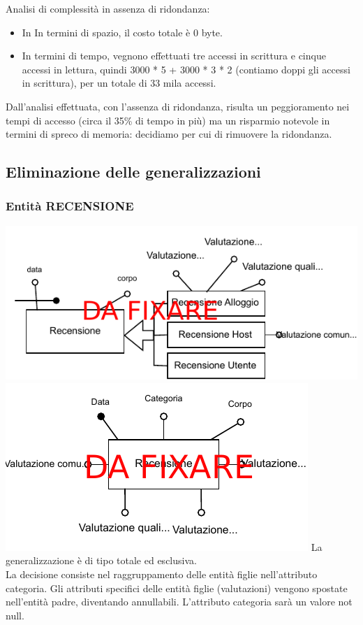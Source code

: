 Analisi di complessità in assenza di ridondanza:
\begin{itemize}
    \item In In termini di spazio, il costo totale è 0 byte.
    \item In termini di tempo, vegnono effettuati tre accessi in scrittura e cinque accessi in lettura, quindi 3000 * 5 + 3000 * 3 * 2 (contiamo doppi gli accessi in scrittura), per un totale di 33 mila accessi.
\end{itemize}

Dall'analisi effettuata, con l'assenza di ridondanza, risulta un peggioramento nei tempi di accesso (circa il 35\% di tempo in più) ma un risparmio notevole in termini di spreco di memoria: decidiamo per cui di rimuovere la ridondanza.

\subsection{Eliminazione delle generalizzazioni}
\subsubsection{Entità RECENSIONE}
\includegraphics[width=\textwidth]{resources/page7}
\includegraphics[width=\textwidth]{resources/page8}
La generalizzazione è di tipo totale ed esclusiva.\\
La decisione consiste nel raggruppamento delle entità	figlie nell'attributo categoria. Gli attributi specifici delle entità figlie (valutazioni) vengono spostate nell'entità padre, diventando annullabili. L'attributo categoria sarà un valore not null.

